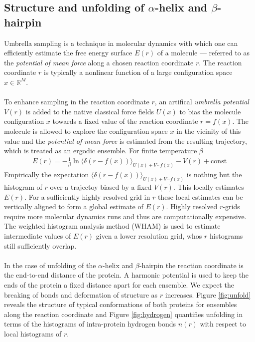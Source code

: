 \documentclass{article}[12pt]
\numberwithin{equation}{section}
\begin{document}
\subsection{Structure and unfolding of $\alpha$-helix and $\beta$-hairpin}
Umbrella sampling is a technique in molecular dynamics with which one can
efficiently estimate the free energy surface $E(r)$ of a molecule --- referred to as the
\textit{potential of mean force} along a chosen reaction coordinate $r$. The
reaction coordinate $r$ is typically a nonlinear function of a large configuration
space $x\in\mathbb{R}^M$.
\\\\
To enhance sampling in the reaction coordinate $r$, an artifical \textit{umbrella
potential} $V(r)$ is added to the native classical force fields $U(x)$ to bias the molecule
configuration $x$ towards a fixed value of the reaction coordinate $r=f(x)$.
The molecule is allowed to explore the configuration space $x$ in the vicinity of
this value and the \textit{potential of mean force} is estimated from the resulting
trajectory, which is treated as an ergodic ensemble. For finite temperature $\beta$
\begin{align}
	E(r)= -\frac{1}{\beta}\ln\big\langle
	\delta\left(r-f(x)\right)
	\big\rangle_{U(x)+V\circ f(x)}
		-V(r)
		+\mathrm{const}
\end{align}
Empirically the expectation $\langle\delta\left(r-f(x)\right)\rangle_{U(x)+V\circ f(x)}$
is nothing but the histogram of $r$ over a trajectoy biased by a fixed $V(r)$. This
locally estimates $E(r)$. For a sufficiently highly resolved grid in $r$ these
local estimates can be vertically aligned to form a global estimate of $E(r)$.
Highly resolved $r$-grids require more molecular dynamics runs and thus
are computationally expensive. The weighted histogram analysis method (WHAM)
is used to estimate intermediate values of $E(r)$ given a lower resolution grid,
whos $r$ histograms still sufficiently overlap.
\\\\
In the case of unfolding of the $\alpha$-helix and $\beta$-hairpin
the reaction coordinate is the end-to-end distance of the protein. A harmonic
potential is used to keep the ends of the protein a fixed distance apart for
each ensemble. We expect the breaking of bonds and deformation of structure
as $r$ increases.
Figure \ref{fig:unfold} reveals the structure of typical conformations of both
proteins for ensembles along the reaction coordinate and Figure \ref{fig:hydrogen}
quantifies unfolding in terms of the histograms of intra-protein hydrogen bonds
$n(r)$ with respect to local histograms of $r$.
\end{document}

